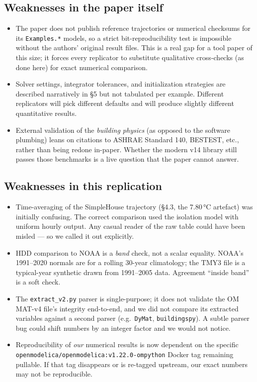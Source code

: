 \documentclass[11pt]{article}
\begin{document}
\subsection{Weaknesses in the paper itself}
\begin{itemize}
  \item The paper does not publish reference trajectories or numerical
        checksums for its \texttt{Examples.*} models, so a strict
        bit-reproducibility test is impossible without the authors'
        original result files. This is a real gap for a tool paper of this
        size; it forces every replicator to substitute qualitative
        cross-checks (as done here) for exact numerical comparison.
  \item Solver settings, integrator tolerances, and initialization
        strategies are described narratively in \S5 but not tabulated per
        example. Different replicators will pick different defaults and
        will produce slightly different quantitative results.
  \item External validation of the \emph{building physics} (as opposed
        to the software plumbing) leans on citations to ASHRAE Standard 140,
        BESTEST, etc., rather than being redone in-paper. Whether the
        modern v14 library still passes those benchmarks is a live
        question that the paper cannot answer.
\end{itemize}

\subsection{Weaknesses in this replication}
\begin{itemize}
  \item Time-averaging of the SimpleHouse trajectory (\S4.3, the 7.80\,\si{\celsius}
        artefact) was initially confusing. The correct comparison used the
        isolation model with uniform hourly output. Any casual reader of
        the raw table could have been misled --- so we called it out
        explicitly.
  \item HDD comparison to NOAA is a \emph{band} check, not a scalar
        equality. NOAA's 1991--2020 normals are for a rolling 30-year
        climatology; the TMY3 file is a typical-year synthetic drawn from
        1991--2005 data. Agreement ``inside band'' is a soft check.
  \item The \texttt{extract\_v2.py} parser is single-purpose; it does not
        validate the OM MAT-v4 file's integrity end-to-end, and we did
        not compare its extracted variables against a second parser
        (e.g.\ \texttt{DyMat}, \texttt{buildingspy}). A subtle parser bug
        could shift numbers by an integer factor and we would not notice.
  \item Reproducibility of \emph{our} numerical results is now dependent
        on the specific \texttt{openmodelica/openmodelica:v1.22.0-ompython}
        Docker tag remaining pullable. If that tag disappears or is
        re-tagged upstream, our exact numbers may not be reproducible.
\end{itemize}
\end{document}
